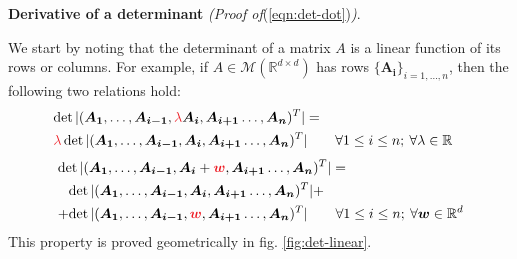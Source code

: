 \documentclass[../../main.tex]{subfiles}
\begin{document}
\begin{expl}\textbf{Derivative of a determinant} \textit{(Proof of}(\ref{eqn:det-dot})\textit{)}.\label{proof:det-dot} 

    We start by noting that the determinant of a matrix $A$ is a linear function of its rows or columns. For example, if $A \in \mathcal{M}(\mathbb{R}^{d \times d})$ has rows $\{\bm{A_i}\}_{i=1,\dots,n}$, then the following two relations hold:
    \begin{align} \label{eqn:prop1}
        \operatorname{det}|(\bm{A_1},\dots,\bm{A_{i-1}}, \textcolor{Red}{\lambda}\bm{A_i}, \bm{A_{i+1}}\dots, \bm{A_n})^T| = \\ \nonumber
       \textcolor{Red}{\lambda} \operatorname{det} | (\bm{A_1},\dots,\bm{A_{i-1}}, \bm{A_i} , \bm{A_{i+1}}\dots, \bm{A_n})^T| \qquad \forall 1 \leq i \leq n; \> \forall \lambda \in \mathbb{R} \span
    \end{align}
    \begin{align} \label{eqn:prop2}
       &\operatorname{det}|(\bm{A_1},\dots,\bm{A_{i-1}}, \bm{A_i} + \textcolor{Red}{\bm{w}}, \bm{A_{i+1}}\dots, \bm{A_n})^T| = \\ \nonumber
       &\hphantom{+}\operatorname{det} | (\bm{A_1},\dots,\bm{A_{i-1}}, \bm{A_i} , \bm{A_{i+1}}\dots, \bm{A_n})^T| +\\ \nonumber
       &\operatorname{+det} | (\bm{A_1},\dots,\bm{A_{i-1}}, \textcolor{Red}{\bm{w}}, \bm{A_{i+1}}\dots, \bm{A_n})^T|
       \qquad \forall 1 \leq i \leq n; \> \forall \bm{w} \in \mathbb{R}^d 
    \end{align}
    This property is proved geometrically in fig. \ref{fig:det-linear}.

    \medskip


\end{expl}
\end{document}
